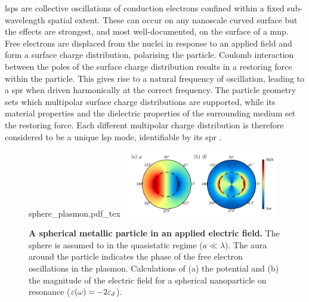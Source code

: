 \documentclass{article}
\begin{document}
\Glspl{lsp} are collective oscillations of conduction electrons confined within a fixed sub-wavelength spatial extent. These can occur on any nanoscale curved surface but the effects are strongest, and most well-documented, on the surface of a \gls{mnp}. Free electrons are displaced from the nuclei in response to an applied field and form a surface charge distribution, polarising the particle. Coulomb interaction between the poles of the surface charge distribution results in a restoring force within the particle. This gives rise to a natural frequency of oscillation, leading to a \gls{spr} when driven harmonically at the correct frequency.
The particle geometry sets which multipolar surface charge distributions are supported, while its material properties and the dielectric properties of the surrounding medium set the restoring force. Each different multipolar charge distribution is therefore considered to be a unique \gls{lsp} mode, identifiable by its \gls{spr} \cite{murray2007}.

\begin{figure}[bt]
\centering
\fontsize{10pt}{1em}\selectfont
\def\svgwidth{0.35\textwidth}
{sphere_plasmon.pdf_tex}
~\includegraphics[width=0.59\textwidth]{figures/spherical_np_dipole_lsp}
\caption[A spherical metallic particle in an applied electric field]{\textbf{A spherical metallic particle in an applied electric field.} The sphere is assumed to in the quasistatic regime ($a\ll\lambda$). The aura around the particle indicates the phase of the free electron oscillations in the plasmon. Calculations of (a) the potential and (b) the magnitude of the electric field for a spherical nanoparticle on resonance ($\varepsilon(\omega)=-2\varepsilon_d$).}
\label{fig:sphere_plasmon}
\end{figure}
\end{document}
